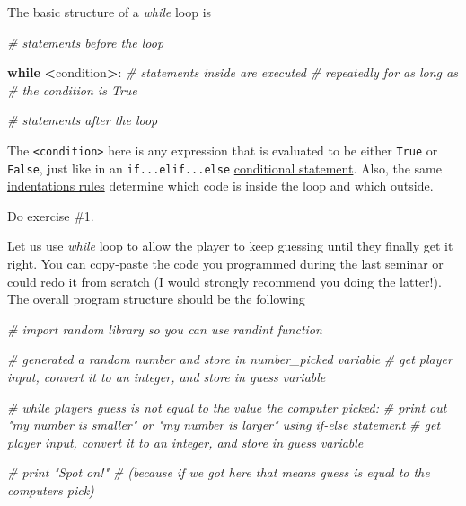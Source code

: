 \documentclass[
]{book}
\newenvironment{Shaded}{\begin{snugshade}}{\end{snugshade}}
\newcommand{\CommentTok}[1]{\textcolor[rgb]{0.56,0.35,0.01}{\textit{#1}}}
\newcommand{\ControlFlowTok}[1]{\textcolor[rgb]{0.13,0.29,0.53}{\textbf{#1}}}
\newcommand{\NormalTok}[1]{#1}
\newcommand{\OperatorTok}[1]{\textcolor[rgb]{0.81,0.36,0.00}{\textbf{#1}}}
\begin{document}
The basic structure of a \emph{while} loop is

\begin{Shaded}
\begin{Highlighting}[]
\CommentTok{\# statements before the loop}

\ControlFlowTok{while} \OperatorTok{\textless{}}\NormalTok{condition}\OperatorTok{\textgreater{}}\NormalTok{:}
    \CommentTok{\# statements inside are executed}
    \CommentTok{\# repeatedly for as long as}
    \CommentTok{\# the condition is True}
    
\CommentTok{\# statements after the loop}
\end{Highlighting}
\end{Shaded}

The \texttt{\textless{}condition\textgreater{}} here is any expression that is evaluated to be either \texttt{True} or \texttt{False}, just like in an \texttt{if...elif...else} \protect\hyperlink{comparisons}{conditional statement}. Also, the same \protect\hyperlink{indentation}{indentations rules} determine which code is inside the loop and which outside.

Do exercise \#1.

Let us use \emph{while} loop to allow the player to keep guessing until they finally get it right. You can copy-paste the code you programmed during the last seminar or could redo it from scratch (I would strongly recommend you doing the latter!). The overall program structure should be the following

\begin{Shaded}
\begin{Highlighting}[]
\CommentTok{\# import random library so you can use randint function}

\CommentTok{\# generated a random number and store in number\_picked variable}
\CommentTok{\# get player input, convert it to an integer, and store in guess variable}

\CommentTok{\# while players guess is not equal to the value the computer picked:}
    \CommentTok{\# print out "my number is smaller" or "my number is larger" using if{-}else statement}
    \CommentTok{\# get player input, convert it to an integer, and store in guess variable}
    
\CommentTok{\# print "Spot on!" }
\CommentTok{\# (because if we got here that means guess is equal to the computer\textquotesingle{}s pick)}
\end{Highlighting}
\end{Shaded}
\end{document}
